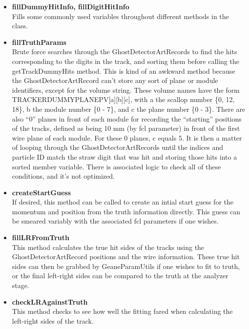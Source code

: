 \begin{enumerate}
\begin{itemize}
          \item{\bf{fillDummyHitInfo, fillDigitHitInfo}} \\
          Fills some commonly used variables throughout different methods in the class.

          \item{\bf{fillTruthParams}} \\
          Brute force searches through the GhostDetectorArtRecords to find the hits corresponding to the digits in the track, and sorting them before calling the getTrackDummyHits method. This is kind of an awkward method because the GhostDetectorArtRecord can't store any sort of plane or module identifiers, except for the volume string. These volume names have the form TRACKERDUMMYPLANEPV[a][b][c], with a the scallop number \{0, 12, 18\}, b the module number \{0 - 7\}, and c the plane number \{0 - 3\}. There are also ``0'' planes in front of each module for recording the ``starting'' positions of the tracks, defined as being 10 mm (by fcl parameter) in front of the first wire plane of each module. For these 0 planes, c equals 5. It is then a matter of looping through the GhostDetectorArtRecords until the indices and particle ID match the straw digit that was hit and storing those hits into a sorted member variable. There is associated logic to check all of these conditions, and it's not optimized.

          \item{\bf{createStartGuess}} \\
          If desired, this method can be called to create an intial start guess for the momentum and position from the truth information directly. This guess can be smeared variably with the associated fcl parameters if one wishes.

          \item{\bf{fillLRFromTruth}} \\
          This method calculates the true hit sides of the tracks using the GhostDetectorArtRecord positions and the wire information. These true hit sides can then be grabbed by GeaneParamUtils if one wishes to fit to truth, or the final left-right sides can be compared to the truth at the analyzer stage.

          \item{\bf{checkLRAgainstTruth}} \\
          This method checks to see how well the fitting fared when calculating the left-right sides of the track.


        \end{itemize}


\end{enumerate}
